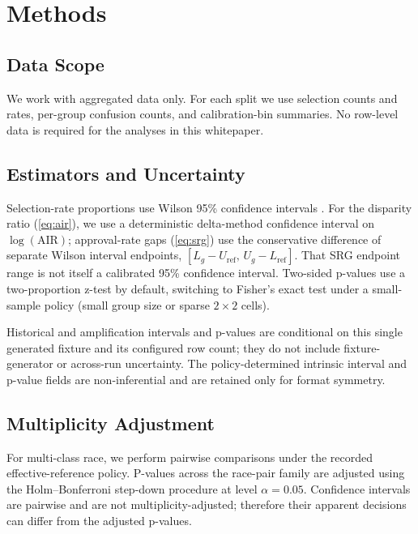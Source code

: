 
\section{Methods}

\subsection{Data Scope}
We work with aggregated data only. For each split we use selection counts and rates, per-group confusion counts, and calibration-bin summaries. No row-level data is required for the analyses in this whitepaper.

\subsection{Estimators and Uncertainty}
Selection-rate proportions use Wilson 95\% confidence intervals \citep{brown2001interval}. For the disparity ratio (\cref{eq:air}), we use a deterministic delta-method confidence interval on $\log(\mathrm{AIR})$; approval-rate gaps (\cref{eq:srg}) use the conservative difference of separate Wilson interval endpoints, $[L_g-U_{\mathrm{ref}},\,U_g-L_{\mathrm{ref}}]$. That SRG endpoint range is not itself a calibrated 95\% confidence interval. Two-sided p-values use a two-proportion z-test by default, switching to Fisher's exact test under a small-sample policy (small group size or sparse $2\times 2$ cells).

Historical and amplification intervals and p-values are conditional on this single generated fixture and its configured row count; they do not include fixture-generator or across-run uncertainty. The policy-determined intrinsic interval and p-value fields are non-inferential and are retained only for format symmetry.

\subsection{Multiplicity Adjustment}
For multi-class race, we perform pairwise comparisons under the recorded effective-reference policy. P-values across the race-pair family are adjusted using the Holm--Bonferroni step-down procedure at level $\alpha=0.05$. Confidence intervals are pairwise and are not multiplicity-adjusted; therefore their apparent decisions can differ from the adjusted p-values.
